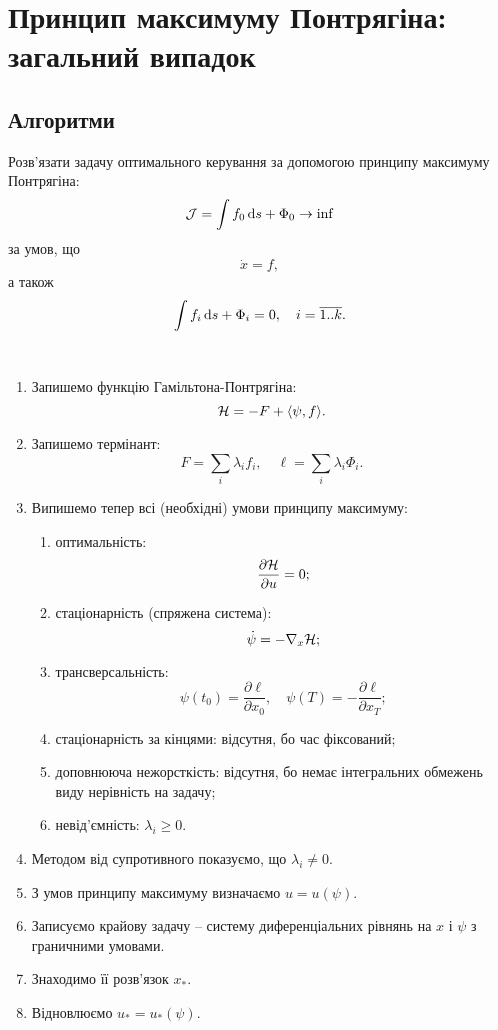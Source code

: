 \section{Принцип максимуму Понтрягіна: загальний випадок}

\subsection{Алгоритми}

\begin{problem*}
	Розв'язати задачу оптимального керування за допомогою принципу максимуму Понтрягіна: \[ \mathcal{J}  = \int f_0 \mathop{}\!\mathrm{d} s + \Phi_0 \to \inf \] за умов, що \[ \dot x = f, \] а також \[ \int f_i \mathop{}\!\mathrm{d} s + \Phi_i = 0 , \quad i = \overline{1..k}. \]
\end{problem*}

\begin{algorithm} \tt
	\begin{enumerate}
		\item Запишемо функцію Гамільтона-Понтрягіна: \[ \mathcal{H} = -F + \langle \psi, f \rangle. \]
		\item Запишемо термінант: \[ F = \sum_i \lambda_i f_i, \quad \ell = \sum_i \lambda_i \Phi_i. \]
		\item Випишемо тепер всі (необхідні) умови принципу максимуму:
		\begin{enumerate}
			\item оптимальність: \[\frac{\partial \mathcal{H}}{\partial u} = 0;\]
			\item стаціонарність (спряжена система): \[\dot \psi = - \nabla_x \mathcal{H};\]
			\item трансверсальність: \[\psi(t_0) = \frac{\partial \ell}{\partial x_0}, \quad \psi(T) = - \frac{\partial \ell}{\partial x_T};\]
			\item стаціонарність за кінцями: відсутня, бо час фіксований;
			\item доповнююча нежорсткість: відсутня, бо немає інтегральних \allowbreak об\-ме\-жень виду нерівність на задачу;
			\item невід'ємність: $\lambda_i \ge 0$.
		\end{enumerate}
		\item Методом від супротивного показуємо, що $\lambda_i \ne 0$.
		\item З умов принципу максимуму визначаємо $u = u(\psi)$.
		\item Записуємо крайову задачу -- систему диференціальних рівнянь на $x$ і $\psi$ з граничними умовами.
		\item Знаходимо її розв'язок $x_*$.
		\item Відновлюємо $u_* = u_*(\psi)$.
	\end{enumerate}
\end{algorithm}

